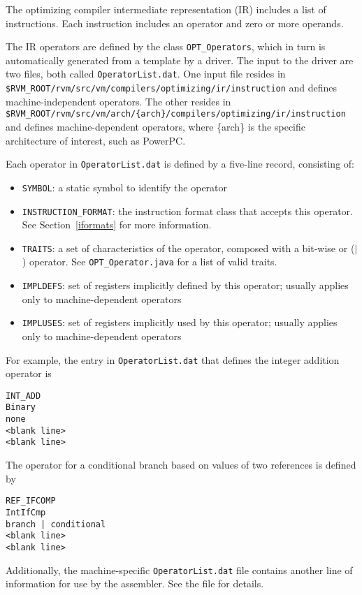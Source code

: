 The optimizing compiler intermediate representation (IR) includes a list
of instructions.  Each instruction includes an operator and zero or
more operands.

The IR operators are defined by the class {\tt OPT\_Operators}, which in
turn is automatically generated from a template by a driver.  The input to the
driver are two files, both called {\tt OperatorList.dat}.  One input
file resides in {\tt \$RVM\_ROOT/rvm/src/vm/compilers/optimizing/ir/instruction} and defines machine-independent
operators.  The other resides in {\tt \$RVM\_ROOT/rvm/src/vm/arch/\{arch\}/compilers/optimizing/ir/instruction}
and defines machine-dependent operators, where \{arch\} is the
specific architecture of interest, such as PowerPC\PowerPCTMFootnote.

Each operator in {\tt OperatorList.dat} is defined by a five-line record,
consisting of:
\begin{itemize}
\item {\tt SYMBOL}: a static symbol to identify the operator
\item {\tt INSTRUCTION\_FORMAT}: the instruction format class that accepts this operator.  See Section~\ref{iformats} for more information.
\item {\tt TRAITS}: a set of characteristics of the operator, composed with a bit-wise or ($|$) operator.  See {\tt OPT\_Operator.java} for a list of valid traits.
\item {\tt IMPLDEFS}: set of registers implicitly defined by this operator; usually applies only to machine-dependent operators
\item {\tt IMPLUSES}: set of registers implicitly used by this operator; usually applies only to machine-dependent operators
\end{itemize}

For example, the entry in {\tt OperatorList.dat} that defines the integer
addition operator is
\begin{verbatim}
INT_ADD
Binary
none
<blank line>
<blank line>
\end{verbatim}

The operator for a conditional branch based on values of two references is
defined by
\begin{verbatim}
REF_IFCOMP
IntIfCmp
branch | conditional
<blank line>
<blank line>
\end{verbatim}

Additionally,  the machine-specific {\tt OperatorList.dat} file contains 
another line of information for use by the assembler.  See the file
for details. 

